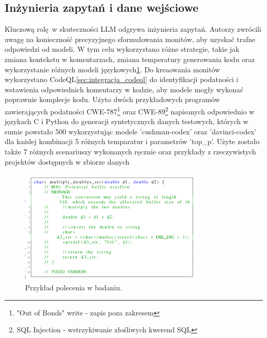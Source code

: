 \subsection{Inżynieria zapytań i dane wejściowe}
Kluczową rolę w skuteczności LLM odgrywa inżynieria zapytań. Autorzy zwrócili uwagę na konieczność precyzyjnego sformułowania monitów, aby uzyskać trafne odpowiedzi od modeli. W tym celu wykorzystano różne strategie, takie jak zmiana kontekstu w komentarzach, zmiana temperatury generowania kodu oraz wykorzystanie różnych modeli językowych\ref{fig:codex-fix-security-bugs-models}. Do kreaowania monitów wykorzystano CodeQL\ref{sec:integracja_codeql} do identyfikacji podatności i wstawienia odpowiednich komentarzy w kodzie, aby modele mogły wykonać poprawnie komplecje kodu. 
Użyto dwóch przykładowych programów zawierających podatności CWE-787\footnote{"Out of Bonds" write - zapis poza zakresem} oraz CWE-89\footnote{SQL Injection - wstrzykiwanie złośliwych kwerend SQL} napisanych odpowiednio w językach C i Python do generacji syntetycznych danych testowych, których w sumie powstało 500 wykorzystując modele 'cushman-codex' oraz 'davinci-codex' dla każdej kombinacji 5 różnych temparatur i parametrów 'top\_p'. Użyte zostało także 7 różnych scenariuszy wykonanych ręcznie oraz przykłady z rzeczywistych projektów dostępnych w zbiorze danych 

\begin{figure}[H]
    \centering
    \includegraphics[width=0.8\textwidth]{img/prompt-codex.png}
    \caption{Przykład polecenia w badaniu\cite{codex-fix-security-bugs}.}
    \label{fig:codex-fix-security-bugs-models}
\end{figure}

